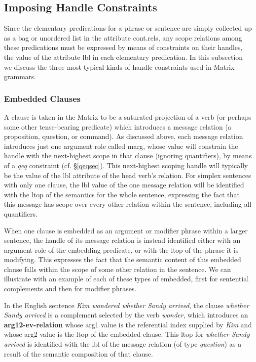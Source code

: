 \documentclass[12pt]{article}
\begin{document}
\subsection{Imposing Handle Constraints}
\label{hconssec}

Since the elementary predications for a phrase or sentence are simply 
collected up as a bag or unordered list in the attribute {\sc cont.rels},
any scope relations among these predications must be expressed by means of
constraints on their handles, the value of the attribute {\sc lbl} in each
elementary predication.  In this subsection we discuss the three most typical
kinds of handle constraints used in Matrix grammars.

\subsubsection{Embedded Clauses}
\label{msgsec}

A clause is taken in the Matrix to be a saturated projection of a verb (or
perhaps some other tense-bearing predicate) which introduces a message
relation (a proposition, question, or command).  As discussed above, each
message relation introduces just one argument role called {\sc marg}, whose
value will constrain the handle with the next-highest scope in that clause
(ignoring quantifiers), by means of a {\it qeq} constraint 
(cf. \S\ref{qeqsec}). 
This next-highest scoping handle will typically be the value of the {\sc lbl}
attribute of the head verb's relation.  For simplex sentences with only one
clause, the {\sc lbl} value of the one message relation will be identified
with the {\sc ltop} of the semantics for the whole sentence, expressing the
fact that this message has scope over every other relation within the
sentence, including all quantifiers.

When one clause is embedded as an argument or modifier phrase within a larger
sentence, the handle of its message relation is instead identified either with 
an argument role of the embedding predicate, or with the {\sc ltop} of the
phrase it is modifying.  This expresses the fact that the semantic content
of this embedded clause falls within the scope of some other relation in the
sentence.  We can illustrate with an example of each of these types of
embedded, first for sentential complements and then for modifier phrases.

In the English sentence {\it Kim wondered whether Sandy arrived}, the clause
{\it whether Sandy arrived} is a complement selected by the verb {\it wonder},
which introduces an {\bf arg12-ev-relation} whose {\sc arg1} value is the
referential index supplied by {\it Kim} and whose {\sc arg2} value is the
{\sc ltop} of the embedded clause.  This {\sc ltop} for {\it whether Sandy
arrived} is identified with the {\sc lbl} of the message relation (of type
{\it question}) as a result of the semantic composition of that clause.
\end{document}
